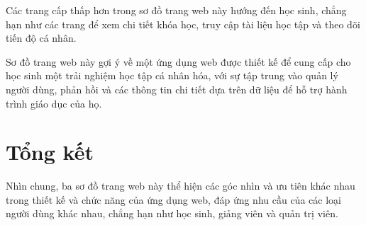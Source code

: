 \par Các trang cấp thấp hơn trong sơ đồ trang web này hướng đến học sinh, chẳng hạn như các trang để xem chi tiết khóa học, truy cập tài liệu học tập và theo dõi tiến độ cá nhân.

\par Sơ đồ trang web này gợi ý về một ứng dụng web được thiết kế để cung cấp cho học sinh một trải nghiệm học tập cá nhân hóa, với sự tập trung vào quản lý người dùng, phản hồi và các thông tin chi tiết dựa trên dữ liệu để hỗ trợ hành trình giáo dục của họ.
\section*{Tổng kết}

Nhìn chung, ba sơ đồ trang web này thể hiện các góc nhìn và ưu tiên khác nhau trong thiết kế và chức năng của ứng dụng web, đáp ứng nhu cầu của các loại người dùng khác nhau, chẳng hạn như học sinh, giảng viên và quản trị viên.